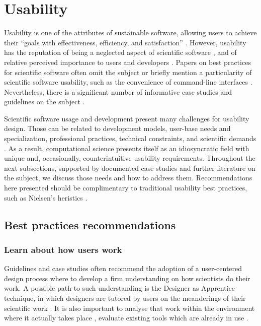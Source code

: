 \section{Usability}
\label{sec:usability}

Usability is one of the attributes of sustainable software, allowing users to achieve their “goals with effectiveness, efficiency, and satisfaction” \cite[p.3]{Venters_WSSSPE}. However, usability has the reputation of being a neglected aspect of scientific software \cite{Ahmed:2014}, and of relative perceived importance to users and developers \cite{Nguyen-Hoan:2010, Hucka:2016}. Papers on best practices for scientific software often omit the subject \cite{Stodden_WSSSPE, Wilson:2016} or briefly mention a particularity of scientific software usability, such as the convenience of command-line interfaces \cite{bestprSC}. Nevertheless, there is a significant number of informative case studies and guidelines on the subject \cite{MacLeod:1992, Springmeyer:1993, Pancake:1996, Javahery:2004, Schraefel:2004,Letondal:2004, Talbott:2005, Macaulay:2009, DeRoure:2009, Keefe:2010, DeMatos:2013, Ahmed:2014, Beg:2016}.

Scientific software usage and development present many challenges for usability design. Those can be related to development models, user-base needs and specialization, professional practices, technical constraints, and scientific demands \cite{Queiroz:2016}. As a result, computational science presents itself as an idiosyncratic field with unique and, occasionally, counterintuitive usability requirements. Throughout the next subsections, supported by documented case studies and further literature on the subject, we discuss those needs and how to address them. Recommendations here presented should be complimentary to traditional usability best practices, such as Nielsen's heristics \cite{Nielsen:1994}.

\subsection{Best practices recommendations}


\subsubsection{Learn about how users work}

Guidelines and case studies often recommend the adoption of a user-centered design process where to develop a firm understanding on how scientists do their work.  A possible path to such understanding is the Designer as Apprentice technique, in which designers are tutored by users on the meanderings of their scientific work \cite{Springmeyer:1993}.  It is also important to analyse that work within the environment where it actually takes place \cite{Pancake:1996}, evaluate existing tools which are already in use \cite{Javahery:2004}.  

